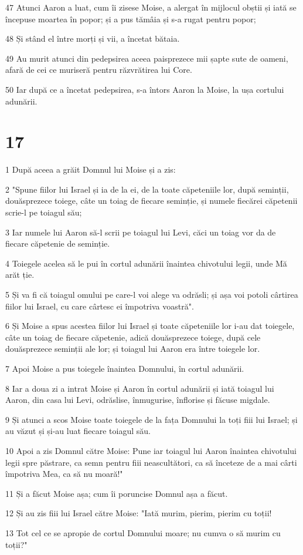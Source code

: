 \par 47 Atunci Aaron a luat, cum îi zisese Moise, a alergat în mijlocul obștii și iată se începuse moartea în popor; și a pus tămâia și s-a rugat pentru popor;
\par 48 Și stând el între morți și vii, a încetat bătaia.
\par 49 Au murit atunci din pedepsirea aceea paisprezece mii șapte sute de oameni, afară de cei ce muriseră pentru răzvrătirea lui Core.
\par 50 Iar după ce a încetat pedepsirea, s-a întors Aaron la Moise, la ușa cortului adunării.

\chapter{17}

\par 1 După aceea a grăit Domnul lui Moise și a zis:
\par 2 "Spune fiilor lui Israel și ia de la ei, de la toate căpeteniile lor, după seminții, douăsprezece toiege, câte un toiag de fiecare seminție, și numele fiecărei căpetenii scrie-l pe toiagul său;
\par 3 Iar numele lui Aaron să-l scrii pe toiagul lui Levi, căci un toiag vor da de fiecare căpetenie de seminție.
\par 4 Toiegele acelea să le pui în cortul adunării înaintea chivotului legii, unde Mă arăt ție.
\par 5 Și va fi că toiagul omului pe care-l voi alege va odrăsli; și așa voi potoli cârtirea fiilor lui Israel, cu care cârtesc ei împotriva voastră".
\par 6 Și Moise a spus acestea fiilor lui Israel și toate căpeteniile lor i-au dat toiegele, câte un toiag de fiecare căpetenie, adică douăsprezece toiege, după cele douăsprezece seminții ale lor; și toiagul lui Aaron era între toiegele lor.
\par 7 Apoi Moise a pus toiegele înaintea Domnului, în cortul adunării.
\par 8 Iar a doua zi a intrat Moise și Aaron în cortul adunării și iată toiagul lui Aaron, din casa lui Levi, odrăslise, înmugurise, înflorise și făcuse migdale.
\par 9 Și atunci a scos Moise toate toiegele de la fața Domnului la toți fiii lui Israel; și au văzut și și-au luat fiecare toiagul său.
\par 10 Apoi a zis Domnul către Moise: Pune iar toiagul lui Aaron înaintea chivotului legii spre păstrare, ca semn pentru fiii neascultători, ca să înceteze de a mai cârti împotriva Mea, ca să nu moară!"
\par 11 Și a făcut Moise așa; cum îi poruncise Domnul așa a făcut.
\par 12 Și au zis fiii lui Israel către Moise: "Iată murim, pierim, pierim cu toții!
\par 13 Tot cel ce se apropie de cortul Domnului moare; nu cumva o să murim cu toții?"

